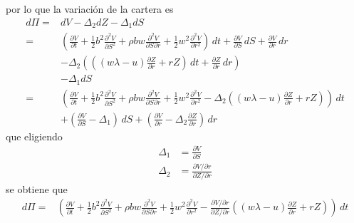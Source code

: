 por lo que la variación de la cartera es
\begin{align*}
    d\Pi =& dV - \Delta_2 dZ - \Delta_1 dS \\
    =& \left( \frac{\partial V}{\partial t} + \frac{1}{2} b^2 \frac{\partial^2 V}{\partial S^2} + \rho b w \frac{\partial^2 V}{\partial S \partial r} + \frac{1}{2} w^2 \frac{\partial^2 V}{\partial r^2} \right)\,dt + \frac{\partial V}{\partial S}\,dS + \frac{\partial V}{\partial r}\,dr \\
    &- \Delta_2 \left(\left((w\lambda - u) \frac{\partial Z}{\partial r} + rZ\right)\,dt + \frac{\partial Z}{\partial r}\,dr \right) \\
    &- \Delta_1 dS \\
    =& \left( \frac{\partial V}{\partial t} + \frac{1}{2} b^2 \frac{\partial^2 V}{\partial S^2} + \rho b w \frac{\partial^2 V}{\partial S \partial r} + \frac{1}{2} w^2 \frac{\partial^2 V}{\partial r^2} - \Delta_2 \left((w\lambda - u) \frac{\partial Z}{\partial r} + rZ\right) \right)\,dt \\
    &+ \left( \frac{\partial V}{\partial S} - \Delta_1 \right)\,dS + \left( \frac{\partial V}{\partial r} - \Delta_2 \frac{\partial Z}{\partial r} \right)\,dr
\end{align*}
que eligiendo
\begin{align*}
    \Delta_1 &= \frac{\partial V}{\partial S} \\
    \Delta_2 &= \frac{\partial V/\partial r}{\partial Z/\partial r}
\end{align*}
se obtiene que
\begin{align*}
    d\Pi =& \left( \frac{\partial V}{\partial t} + \frac{1}{2} b^2 \frac{\partial^2 V}{\partial S^2} + \rho b w \frac{\partial^2 V}{\partial S \partial r} + \frac{1}{2} w^2 \frac{\partial^2 V}{\partial r^2} - \frac{\partial V/\partial r}{\partial Z/\partial r} \left((w\lambda - u) \frac{\partial Z}{\partial r} + rZ\right) \right)\,dt \\
\end{align*}

